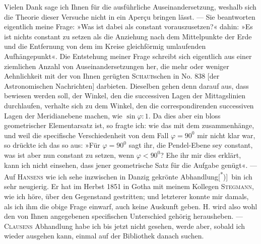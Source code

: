 Vielen Dank sage ich Ihnen für die ausführliche Auseinandersetzung,
weshalb sich die Theorie dieser Versuche nicht in ein Aperçu bringen lässt. —
Sie beantworten eigentlich meine Frage: »Was ist dabei als constant vorauszusetzen?«
dahin: »Es ist nichts constant zu setzen als die Anziehung nach
\clearpage{}
\noindent dem Mittelpunkte der Erde und die Entfernung von dem im Kreise gleichförmig
umlaufenden Aufhängepunkt«. Die Entstehung meiner Frage schreibt
sich eigentlich aus einer ziemlichen Anzahl von Auseinandersetzungen her, die
mehr oder weniger Aehnlichkeit mit der von Ihnen gerügten \textsc{Schaub}schen in
No. 838 [der Astronomischen Nachrichten] darbieten. Dieselben gehen denn
darauf aus, dass bewiesen werden soll, der Winkel, den die successiven Lagen
der Mittagslinien durchlaufen, verhalte sich zu dem Winkel, den die correspondirenden
successiven Lagen der Meridianebene machen, wie \(\sin\varphi:1\).
Da dies aber ein bloss geometrischer Elementarsatz ist, so fragte ich: wie
das mit dem  zusammenhänge, und weil die specifische Verschiedenheit
von dem Fall \(\varphi=90^0\) mir nicht klar war, so drückte ich das so aus:
»Für \(\varphi=90^0\) sagt ihr, die Pendel-Ebene sey constant, was ist aber nun constant
zu setzen, wenn \(\varphi<90^0\)? Ehe ihr mir dies erklärt, kann ich nicht
einsehen, dass jener geometrische Satz für die Aufgabe genügt«. — Auf \textsc{Hansens}
wie ich sehe inzwischen in Danzig gekrönte Abhandlung[\textsuperscript{*})]\begingroup\renewcommand{\thefootnote}{}\endgroup\ bin ich sehr
neugierig. Er hat im Herbst 1851 in Gotha mit meinem Kollegen \textsc{Stegmann},
wie ich höre, über den Gegenstand gestritten; und letzterer konnte mir damals,
als ich ihm die obige Frage einwarf, auch keine Auskunft geben. H.
wird also wohl den von Ihnen angegebenen specifischen Unterschied gehörig
herausheben. — \textsc{Clausens} Abhandlung habe ich bis jetzt nicht gesehen, werde
aber, sobald ich wieder ausgehen kann, einmal auf der Bibliothek danach
suchen.

